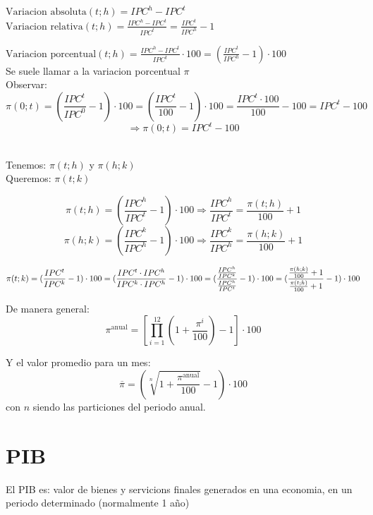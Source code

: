\documentclass{report}
\begin{document}
\(\text{Variacion absoluta}(t;h) = IPC^h - IPC^t\) \\

\(\text{Variacion relativa}(t;h) = \frac{IPC^h - IPC^t}{IPC^t} =
\frac{IPC^t}{IPC^h} -1\) \

\(
\text{Variacion porcentual}(t;h) =
\frac{IPC^h - IPC^t}{IPC^t} \cdot 100 =
(\frac{IPC^t}{IPC^h} -1) \cdot 100
\) \\

Se suele llamar a la variacion porcentual $\pi$ \\

Observar:
\[
	\pi (0;t) = (\frac{IPC^t}{IPC^0} - 1) \cdot 100
	= (\frac{IPC^t }{100} - 1) \cdot 100
	= \frac{IPC^t\cdot 100}{100} - 100
	= IPC^t - 100
\]
\[
	\Rightarrow
	\boxed{
		\pi (0;t) = IPC^t - 100
	}
\]

\noindent{} \\

Tenemos: \( \pi (t;h) \) y \( \pi (h;k) \) \\

Queremos:
\( \pi (t;k) \)

\[
	\pi (t;h) = (\frac{IPC^h}{IPC^t} - 1) \cdot 100
	\Rightarrow
	\frac{IPC^h}{IPC^t} = \frac{\pi (t;h)}{100} + 1
\]
\[
	\pi (h;k) = (\frac{IPC^k}{IPC^h} - 1) \cdot 100
	\Rightarrow
	\frac{IPC^k}{IPC^h} = \frac{\pi (h;k)}{100} + 1
\]

\[
	\pi (t;k) = (\frac{IPC^t}{IPC^k} - 1) \cdot 100
	= (\frac{IPC^t \cdot IPC^h}{IPC^k \cdot IPC^h} - 1) \cdot 100
	= (\frac{\frac{IPC^h}{IPC^k}}{\frac{IPC^h}{IPC^t}}  - 1) \cdot 100 \\
	= (\frac{\frac{\pi(h;k)}{100} + 1}{\frac{\pi(t;h)}{100} + 1} - 1) \cdot 100
\]

De manera general:
\[
	\boxed{
		\pi^{\text{anual}} =
			[\prod^{12}_{i=1} (1 + \frac{\pi^i}{100}) - 1 ] \cdot 100
	}
\]

Y el valor promedio para un mes:
\[
	\boxed{
		\overline{\pi} = ( \sqrt[n]{1 + \frac{\pi^{\text{anual}}}{100}} - 1) \cdot 100
	}
\]
con $n$ siendo las particiones del periodo anual.

\section{PIB}
El PIB es: valor de bienes y servicions finales generados en una economia, en un periodo determinado (normalmente 1 año) \\
\end{document}
